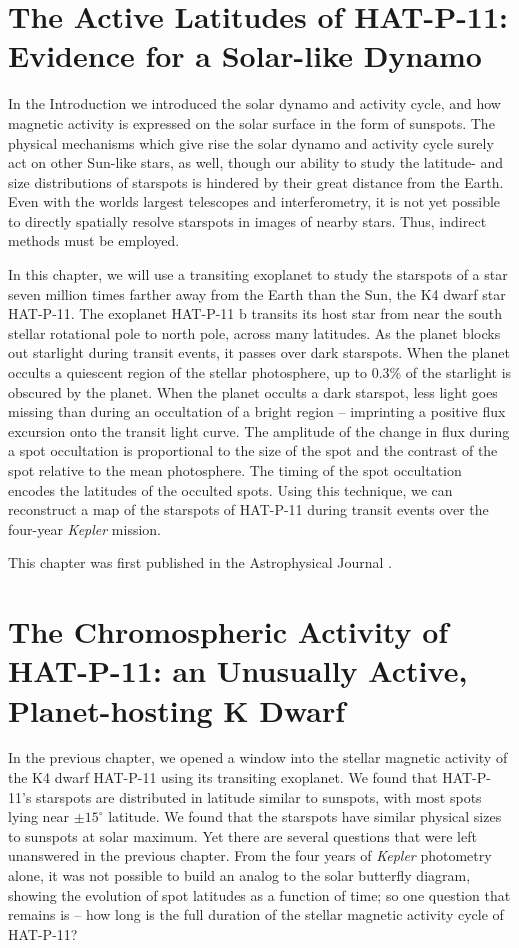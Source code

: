 \documentclass[12pt, twoside]{uwthesis}
\newcommand{\kepler}{\textsl{Kepler}\xspace}
\begin{document}
\chapter{The Active Latitudes of HAT-P-11: Evidence for a Solar-like Dynamo} \label{chap:h11}

In the Introduction we introduced the solar dynamo and activity cycle, and how magnetic activity is expressed on the solar surface in the form of sunspots. The physical mechanisms which give rise the solar dynamo and activity cycle surely act on other Sun-like stars, as well, though our ability to study the latitude- and size distributions of starspots is hindered by their great distance from the Earth. Even with the worlds largest telescopes and interferometry, it is not yet possible to directly spatially resolve starspots in images of nearby stars. Thus, indirect methods must be employed.

In this chapter, we will use a transiting exoplanet to study the starspots of a star seven million times farther away from the Earth than the Sun, the K4 dwarf star HAT-P-11. The exoplanet HAT-P-11 b transits its host star from near the south stellar rotational pole to north pole, across many latitudes. As the planet blocks out starlight during transit events, it passes over dark starspots. When the planet occults a quiescent region of the stellar photosphere, up to 0.3\% of the starlight is obscured by the planet. When the planet occults a dark starspot, less light goes missing than during an occultation of a bright region -- imprinting a positive flux excursion onto the transit light curve. The amplitude of the change in flux during a spot occultation is proportional to the size of the spot and the contrast of the spot relative to the mean photosphere. The timing of the spot occultation encodes the latitudes of the occulted spots. Using this technique, we can reconstruct a map of the starspots of HAT-P-11 during transit events over the four-year \kepler mission. 

This chapter was first published in the Astrophysical Journal \citep{Morris2017a}.



\chapter{The Chromospheric Activity of HAT-P-11: an Unusually Active, Planet-hosting K Dwarf} \label{chap:h11sindex}

In the previous chapter, we opened a window into the stellar magnetic activity of the K4 dwarf HAT-P-11 using its transiting exoplanet. We found that HAT-P-11's starspots are distributed in latitude similar to sunspots, with most spots lying near $\pm15^\circ$ latitude. We found that the starspots have similar physical sizes to sunspots at solar maximum. Yet there are several questions that were left unanswered in the previous chapter. From the four years of \kepler photometry alone, it was not possible to build an analog to the solar butterfly diagram, showing the evolution of spot latitudes as a function of time; so one question that remains is -- how long is the full duration of the stellar magnetic activity cycle of HAT-P-11? 
\end{document}
